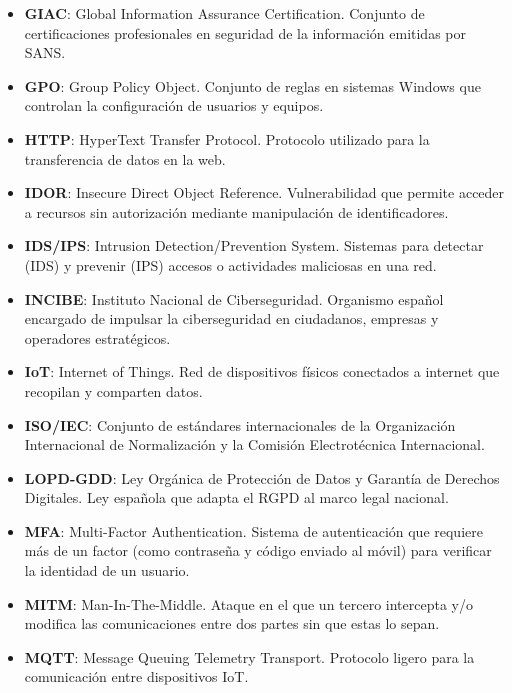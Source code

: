 \documentclass[a4paper, 11pt]{article}
\begin{document}
\begin{itemize}
    \item \textbf{GIAC}: Global Information Assurance Certification. Conjunto de certificaciones profesionales en seguridad de la información emitidas por SANS.

    \item \textbf{GPO}: Group Policy Object. Conjunto de reglas en sistemas Windows que controlan la configuración de usuarios y equipos.

    \item \textbf{HTTP}: HyperText Transfer Protocol. Protocolo utilizado para la transferencia de datos en la web.

    \item \textbf{IDOR}: Insecure Direct Object Reference. Vulnerabilidad que permite acceder a recursos sin autorización mediante manipulación de identificadores.

    \item \textbf{IDS/IPS}: Intrusion Detection/Prevention System. Sistemas para detectar (IDS) y prevenir (IPS) accesos o actividades maliciosas en una red.

    \item \textbf{INCIBE}: Instituto Nacional de Ciberseguridad. Organismo español encargado de impulsar la ciberseguridad en ciudadanos, empresas y operadores estratégicos.

    \item \textbf{IoT}: Internet of Things. Red de dispositivos físicos conectados a internet que recopilan y comparten datos.

    \item \textbf{ISO/IEC}: Conjunto de estándares internacionales de la Organización Internacional de Normalización y la Comisión Electrotécnica Internacional.

    \item \textbf{LOPD-GDD}: Ley Orgánica de Protección de Datos y Garantía de Derechos Digitales. Ley española que adapta el RGPD al marco legal nacional.

    \item \textbf{MFA}: Multi-Factor Authentication. Sistema de autenticación que requiere más de un factor (como contraseña y código enviado al móvil) para verificar la identidad de un usuario.

    \item \textbf{MITM}: Man-In-The-Middle. Ataque en el que un tercero intercepta y/o modifica las comunicaciones entre dos partes sin que estas lo sepan.

    \item \textbf{MQTT}: Message Queuing Telemetry Transport. Protocolo ligero para la comunicación entre dispositivos IoT.


\end{itemize}
\end{document}
